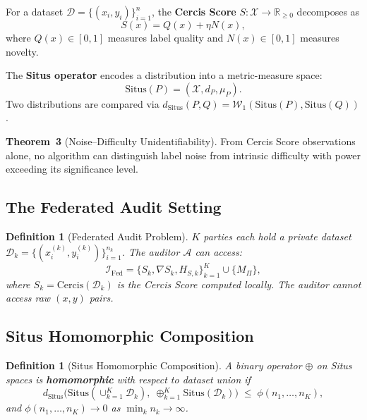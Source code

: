 \documentclass[12pt,a4paper]{article}
\newtheorem{definition}[theorem]{Definition}
\newcommand{\R}{\mathbb{R}}
\newcommand{\cX}{\mathcal{X}}
\newcommand{\cD}{\mathcal{D}}
\newcommand{\cA}{\mathcal{A}}
\newcommand{\cI}{\mathcal{I}}
\newcommand{\Situs}{\mathrm{Situs}}
\newcommand{\Cercis}{\mathrm{Cercis}}
\newcommand{\dSitus}{d_{\mathrm{Situs}}}
\newcommand{\Wass}{\mathcal{W}}
\begin{document}
For a dataset $\cD = \{(x_i, y_i)\}_{i=1}^n$, the \textbf{Cercis Score}
$S: \cX \to \R_{\geq 0}$ decomposes as
\begin{equation}\label{eq:cercis}
    S(x) = Q(x) + \eta N(x),
\end{equation}
where $Q(x) \in [0,1]$ measures label quality and $N(x) \in [0,1]$ measures novelty.

The \textbf{Situs operator} encodes a distribution into a metric-measure space:
\begin{equation}\label{eq:situs}
    \Situs(P) = (\cX, d_P, \mu_P).
\end{equation}
Two distributions are compared via $\dSitus(P, Q) = \Wass_1(\Situs(P), \Situs(Q))$.

\textbf{Theorem~3} (Noise--Difficulty Unidentifiability). From Cercis Score
observations alone, no algorithm can distinguish label noise from intrinsic
difficulty with power exceeding its significance level.

\subsection{The Federated Audit Setting}

\begin{definition}[Federated Audit Problem]
\label{def:fed-problem}
$K$ parties each hold a private dataset $\cD_k = \{(x_i^{(k)}, y_i^{(k)})\}_{i=1}^{n_k}$.
The auditor $\cA$ can access:
\begin{equation}\label{eq:fed-info}
    \cI_{\mathrm{Fed}} = \{S_k, \nabla S_k, H_{S,k}\}_{k=1}^K \cup \{M_\Pi\},
\end{equation}
where $S_k = \Cercis(\cD_k)$ is the Cercis Score computed locally. The auditor \emph{cannot} access raw $(x, y)$ pairs.
\end{definition}

\subsection{Situs Homomorphic Composition}

\begin{definition}[Situs Homomorphic Composition]
\label{def:situs-hom}
A binary operator $\oplus$ on Situs spaces is \textbf{homomorphic} with respect to dataset union if
\begin{equation}\label{eq:homomorphism}
    \dSitus\!\big(\Situs(\cup_{k=1}^K \cD_k),\;
    \oplus_{k=1}^K \Situs(\cD_k)\big)
    \;\leq\; \phi(n_1, \dots, n_K),
\end{equation}
and $\phi(n_1, \dots, n_K) \to 0$ as $\min_k n_k \to \infty$.
\end{definition}
\end{document}
